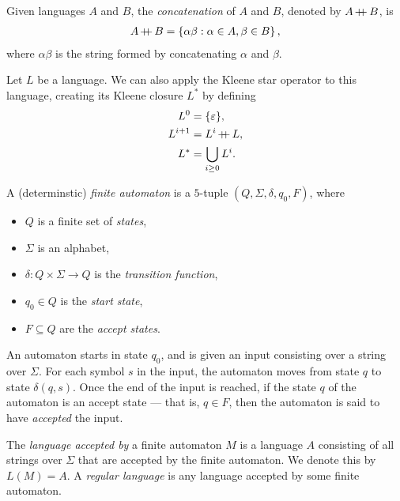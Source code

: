 \begin{defn}
    Given languages $A$ and $B$, the \emph{concatenation} of $A$ and $B$, denoted by $A \kern-0.2ex+\kern-1.5ex+\kern0.4ex B$, is
    \begin{align*}
        A \kern-0.2ex+\kern-1.5ex+\kern0.4ex B = \left\{\alpha\beta : \alpha \in A, \beta \in B \right\},
    \end{align*}
    where $\alpha\beta$ is the string formed by concatenating $\alpha$ and $\beta$.
\end{defn}

\begin{defn}
    Let $L$ be a language. We can also apply the Kleene star operator to this language, creating its Kleene closure $L^*$ by defining
    \begin{align*}
        L^0 &= \{\varepsilon\}, \\
        L^{i+1} &= L^{i} \kern-0.2ex+\kern-1.5ex+\kern0.4ex L, \\
        L^{*} &= \bigcup_{i \geq 0}L^{i}.
    \end{align*}
\end{defn}

\begin{defn}
    A (determinstic) \emph{finite automaton} is a $5$-tuple $(Q, \Sigma, \delta, q_0, F)$, where
    \begin{itemize}
        \item $Q$ is a finite set of \emph{states},
        \item $\Sigma$ is an alphabet,
        \item $\delta: Q \times \Sigma \to Q$ is the \emph{transition function},
        \item $q_0 \in Q$ is the \emph{start state},
        \item $F \subseteq Q$ are the \emph{accept states}.
    \end{itemize}
    An automaton starts in state $q_0$, and is given an input consisting over a string over $\Sigma$. For each symbol $s$ in the input, the automaton moves from state $q$ to state $\delta(q, s)$. Once the end of the input is reached, if the state $q$ of the automaton is an accept state --- that is, $q \in F$, then the automaton is said to have \emph{accepted} the input.
\end{defn}

\begin{defn}
    The \emph{language accepted by} a finite automaton $M$ is a language $A$ consisting of all strings over $\Sigma$ that are accepted by the finite automaton. We denote this by $L(M) = A$. A \emph{regular language} is any language accepted by some finite automaton.
\end{defn}


